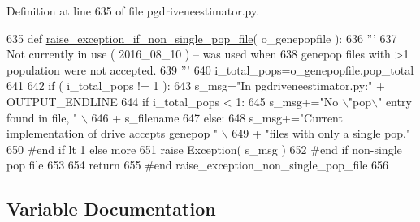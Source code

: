 Definition at line 635 of file pgdriveneestimator.\+py.


\begin{DoxyCode}
635 \textcolor{keyword}{def }\hyperlink{namespacenegui_1_1pgdriveneestimator_ac98833013f11d6aa3544b0fc60951632}{raise\_exception\_if\_non\_single\_pop\_file}( o\_genepopfile ):
636     \textcolor{stringliteral}{'''}
637 \textcolor{stringliteral}{    Not currently in use ( 2016\_08\_10 ) -- was used when}
638 \textcolor{stringliteral}{    genepop files with >1 population were not accepted.}
639 \textcolor{stringliteral}{    '''}
640     i\_total\_pops=o\_genepopfile.pop\_total
641 
642     \textcolor{keywordflow}{if} ( i\_total\_pops != 1 ):
643         s\_msg=\textcolor{stringliteral}{"In pgdriveneestimator.py:"} + OUTPUT\_ENDLINE
644         \textcolor{keywordflow}{if} i\_total\_pops < 1:
645             s\_msg+=\textcolor{stringliteral}{"No \(\backslash\)"pop\(\backslash\)" entry found in file, "} \(\backslash\)
646                     + s\_filename
647         \textcolor{keywordflow}{else}:
648             s\_msg+=\textcolor{stringliteral}{"Current implementation of drive accepts genepop "} \(\backslash\)
649                 + \textcolor{stringliteral}{"files with only a single pop."}
650         \textcolor{comment}{#end if lt 1 else more}
651         \textcolor{keywordflow}{raise} Exception( s\_msg )
652     \textcolor{comment}{#end if non-single pop file}
653 
654     \textcolor{keywordflow}{return}
655 \textcolor{comment}{#end raise\_exception\_non\_single\_pop\_file}
656 
\end{DoxyCode}


\subsection{Variable Documentation}
